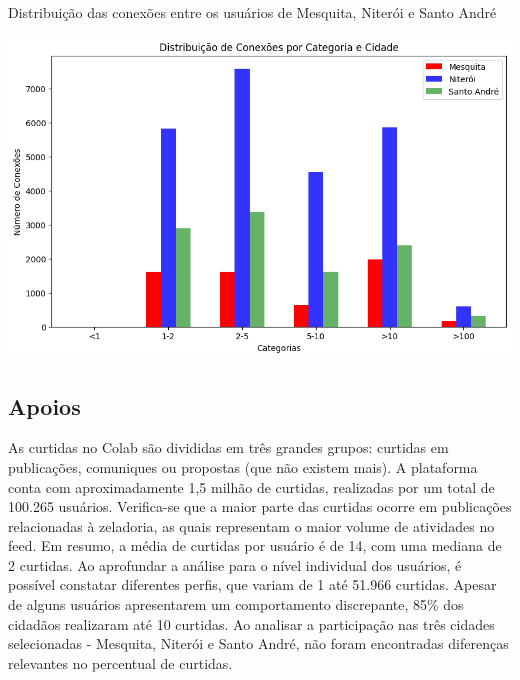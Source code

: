\begin{quadro}[!htb]
	\caption{Distribuição das conexões entre os usuários de Mesquita, Niterói e Santo André}
	\label{fig:colab_users_by_connections_on_cities}
	\centering
	\includegraphics[scale=0.7]{images/colab_users_by_connections_on_cities.png}
\end{quadro}

\subsection*{Apoios}

As curtidas no Colab são divididas em três grandes grupos: curtidas em publicações, comuniques ou propostas (que não existem mais). A plataforma conta com aproximadamente 1,5 milhão de curtidas, realizadas por um total de 100.265 usuários. Verifica-se que a maior parte das curtidas ocorre em publicações relacionadas à zeladoria, as quais representam o maior volume de atividades no feed. Em resumo, a média de curtidas por usuário é de 14, com uma mediana de 2 curtidas. Ao aprofundar a análise para o nível individual dos usuários, é possível constatar diferentes perfis, que variam de 1 até 51.966 curtidas. Apesar de alguns usuários apresentarem um comportamento discrepante, 85\% dos cidadãos realizaram até 10 curtidas. Ao analisar a participação nas três cidades selecionadas - Mesquita, Niterói e Santo André, não foram encontradas diferenças relevantes no percentual de curtidas.

